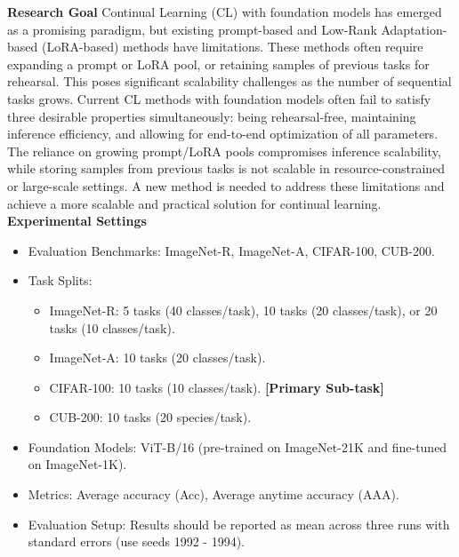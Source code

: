 \documentclass[11pt]{article}
\theoremstyle{plain}
\theoremstyle{definition}
\theoremstyle{remark}
\begin{document}
\begin{tcolorbox}[
    colback=white,
    colframe=myPastelGreen,
    title=\textbf{\textcolor{black}{Task Description}},
    boxrule=0.5mm,
    width=\linewidth,
    arc=2mm,
    boxsep=5pt,
    left=6pt, right=6pt, top=6pt, bottom=6pt,
    breakable
]

\textbf{Research Goal}
Continual Learning (CL) with foundation models has emerged as a promising paradigm, but existing prompt-based and Low-Rank Adaptation-based (LoRA-based) methods have limitations. These methods often require expanding a prompt or LoRA pool, or retaining samples of previous tasks for rehearsal. This poses significant scalability challenges as the number of sequential tasks grows. Current CL methods with foundation models often fail to satisfy three desirable properties simultaneously: being rehearsal-free, maintaining inference efficiency, and allowing for end-to-end optimization of all parameters. The reliance on growing prompt/LoRA pools compromises inference scalability, while storing samples from previous tasks is not scalable in resource-constrained or large-scale settings. A new method is needed to address these limitations and achieve a more scalable and practical solution for continual learning.\\

\textbf{Experimental Settings}

\begin{itemize}[nolistsep, noitemsep]
    \item Evaluation Benchmarks: ImageNet-R, ImageNet-A, CIFAR-100, CUB-200.
    \item Task Splits:
    \begin{itemize}[noitemsep, nolistsep]
        \item ImageNet-R: 5 tasks (40 classes/task), 10 tasks (20 classes/task), or 20 tasks (10 classes/task).
        \item ImageNet-A: 10 tasks (20 classes/task).
        \item CIFAR-100: 10 tasks (10 classes/task). \textbf{[Primary Sub-task]}
        \item CUB-200: 10 tasks (20 species/task).
    \end{itemize}
    \item Foundation Models: ViT-B/16 (pre-trained on ImageNet-21K and fine-tuned on ImageNet-1K).
    \item Metrics: Average accuracy (Acc), Average anytime accuracy (AAA).
    \item Evaluation Setup: Results should be reported as mean across three runs with standard errors (use seeds 1992 - 1994).\\
\end{itemize} 
   

\end{tcolorbox}
\end{document}

